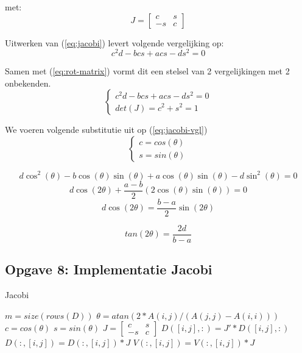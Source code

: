 \documentclass[a4paper]{article}
\newcommand{\opgave}[1]{\subsection{Opgave #1}}
\begin{document}
met: $$J = \begin{bmatrix}
c & s \\ -s & c
\end{bmatrix}$$

Uitwerken van (\ref{eq:jacobi}) levert volgende vergelijking op:
\begin{equation} \label{eq:jacobi-vgl}
c^2d-bcs+acs-ds^2 = 0
\end{equation}

Samen met (\ref{eq:rot-matrix}) vormt dit een stelsel van 2 vergelijkingen met 2 onbekenden.
\begin{equation}
\begin{cases}
c^2d-bcs+acs-ds^2 = 0 \\ det(J) = c^2 + s^2 = 1
\end{cases}
\end{equation}

We voeren volgende substitutie uit op (\ref{eq:jacobi-vgl})
\begin{equation}
\begin{cases}
c = cos(\theta) \\ s = sin(\theta)
\end{cases}
\end{equation}

$$ d \cos^2(\theta) - b \cos(\theta) \sin(\theta) + a \cos(\theta) \sin(\theta) - d \sin^2(\theta) = 0$$
$$ d \cos(2\theta) + \frac{a-b}{2}(2 \cos(\theta)\sin(\theta)) = 0 $$
$$ d \cos(2\theta) = \frac{b-a}{2}\sin(2\theta)$$

\begin{equation}
tan(2\theta) = \frac{2d}{b-a}
\end{equation}

\opgave{8: Implementatie Jacobi}\label{sec:oef8}

\begin{algorithm}[H]
\begin{algorithmic}[H]\label{alg:SI}\caption{Jacobi}
\State $m = size(rows(D))$
\State $\theta = atan(2*A(i,j)/(A(j,j) - A(i,i)))$
\State $c = cos(\theta)$
\State $s = sin(\theta)$
\State $J = \begin{bmatrix}c & s \\ -s & c \end{bmatrix}$
\State $D([i, j], :) = J' * D([i, j], :)$
\State $D(:, [i, j]) = D(:, [i, j]) * J$
\State $V(:, [i, j]) = V(:, [i, j]) * J$
\EndFor
\EndFor
\EndWhile
\end{algorithmic}
\end{algorithm}
\end{document}
